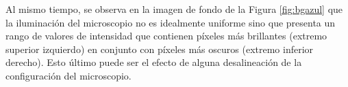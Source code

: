 \begin{figure}[H]
\begin{floatrow}
		\end{floatrow}
	\end{figure}
Al mismo tiempo, se observa en la imagen de fondo de la Figura \ref{fig:bgazul} que la iluminación del microscopio no es idealmente uniforme sino que presenta un rango de valores de intensidad que contienen píxeles más brillantes (extremo superior izquierdo) en conjunto con píxeles más oscuros (extremo inferior derecho). Esto último puede ser el efecto de alguna desalineación de la configuración del microscopio.

